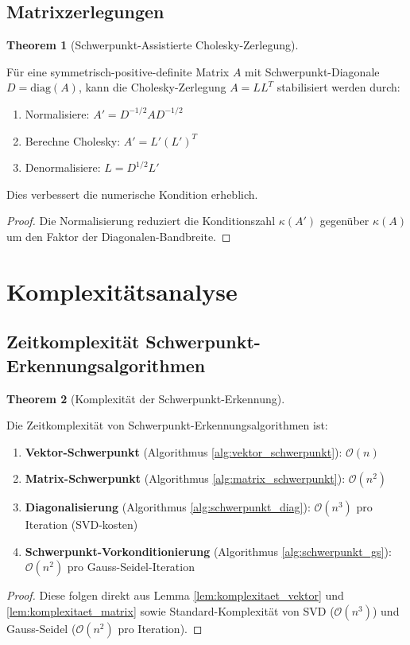 \documentclass[a4paper,12pt]{article}
\theoremstyle{definition}
\newtheorem{theorem}{Theorem}
\begin{document}
\subsection{Matrixzerlegungen}

\begin{theorem}[Schwerpunkt-Assistierte Cholesky-Zerlegung]
\label{thm:schwerpunkt_cholesky}

Für eine symmetrisch-positive-definite Matrix $A$ mit Schwerpunkt-Diagonale $D = \text{diag}(A)$, kann die Cholesky-Zerlegung $A = LL^T$ stabilisiert werden durch:

\begin{enumerate}
\item Normalisiere: $A' = D^{-1/2} A D^{-1/2}$
\item Berechne Cholesky: $A' = L' (L')^T$
\item Denormalisiere: $L = D^{1/2} L'$
\end{enumerate}

Dies verbessert die numerische Kondition erheblich.

\begin{proof}
Die Normalisierung reduziert die Konditionszahl $\kappa(A')$ gegenüber $\kappa(A)$ um den Faktor der Diagonalen-Bandbreite.
\end{proof}
\end{theorem}

\section{Komplexitätsanalyse}

\subsection{Zeitkomplexität Schwerpunkt-Erkennungsalgorithmen}

\begin{theorem}[Komplexität der Schwerpunkt-Erkennung]
\label{thm:komplexitaet_gesamt}

Die Zeitkomplexität von Schwerpunkt-Erkennungsalgorithmen ist:

\begin{enumerate}
\item \textbf{Vektor-Schwerpunkt} (Algorithmus \ref{alg:vektor_schwerpunkt}): $\mathcal{O}(n)$
\item \textbf{Matrix-Schwerpunkt} (Algorithmus \ref{alg:matrix_schwerpunkt}): $\mathcal{O}(n^2)$
\item \textbf{Diagonalisierung} (Algorithmus \ref{alg:schwerpunkt_diag}): $\mathcal{O}(n^3)$ pro Iteration (SVD-kosten)
\item \textbf{Schwerpunkt-Vorkonditionierung} (Algorithmus \ref{alg:schwerpunkt_gs}): $\mathcal{O}(n^2)$ pro Gauss-Seidel-Iteration
\end{enumerate}

\begin{proof}
Diese folgen direkt aus Lemma \ref{lem:komplexitaet_vektor} und \ref{lem:komplexitaet_matrix} sowie Standard-Komplexität von SVD ($\mathcal{O}(n^3)$) und Gauss-Seidel ($\mathcal{O}(n^2)$ pro Iteration).
\end{proof}
\end{theorem}
\end{document}
